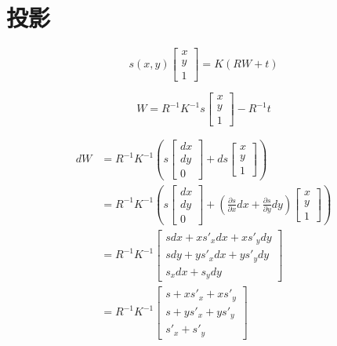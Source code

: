 \section{投影}
\begin{equation}
	s(x,y)
	\begin{bmatrix}
		x \\ y \\ 1
	\end{bmatrix}
	=K(RW+t)
\end{equation}

\begin{equation}
	W=R^{-1} K^{-1} s
	\begin{bmatrix}
		x \\ y \\ 1
	\end{bmatrix}
	- R^{-1} t
\end{equation}

\begin{equation}
	\begin{split}
		dW
		& = R^{-1} K^{-1} \left(
		s \begin{bmatrix} dx \\ dy \\ 0 \end{bmatrix}
		+
		ds \begin{bmatrix} x \\ y \\ 1 \end{bmatrix}
		\right)
		\\
		& = R^{-1} K^{-1} \left(
		s \begin{bmatrix} dx \\ dy \\ 0 \end{bmatrix}
		+
		\left(\frac{\partial s}{\partial x} dx + \frac{\partial s}{\partial y} dy\right) \begin{bmatrix} x \\ y \\ 1 \end{bmatrix}
		\right)
		\\
		& = R^{-1} K^{-1}
		\begin{bmatrix}
			s dx + x s'_x dx + x s'_y dy \\
			s dy + y s'_x dx + y s'_y dy \\
			s_x dx + s_y dy
		\end{bmatrix}
		\\
		& = R^{-1} K^{-1}
		\begin{bmatrix}
			s + x s'_x + x s'_y \\
			s + y s'_x + y s'_y \\
			s'_x + s'_y
		\end{bmatrix}
	\end{split}
\end{equation}

